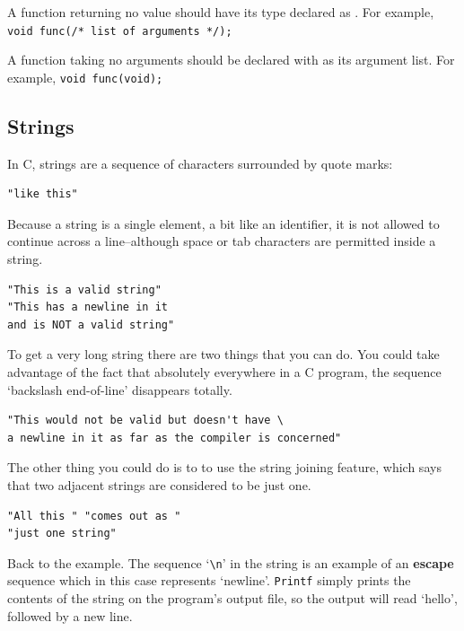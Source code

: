     A function returning no value should have its type declared as
     \void. For example,
     \texttt{void func(/* list of arguments */);}
    

    A function taking no arguments should be declared with \void{}
     as its argument list. For example, \texttt{void func(void);}

   

  

  \subsection{Strings}
   

   In C, strings are a sequence of characters surrounded by quote marks:


   \begin{Verbatim}
"like this"
\end{Verbatim}

   Because a string is a single element, a bit like an identifier, it is not
    allowed to continue across a line--although space or tab characters
    are permitted inside a string.


   \begin{Verbatim}
"This is a valid string"
"This has a newline in it
and is NOT a valid string"
\end{Verbatim}

   To get a very long string there are two things that you can do. You could
    take advantage of the fact that absolutely everywhere in a C program, the
    sequence `backslash end-of-line' disappears totally.


   \begin{Verbatim}
"This would not be valid but doesn't have \
a newline in it as far as the compiler is concerned"
\end{Verbatim}

   The other thing you could do is to to use the string joining feature,
    which says that two adjacent strings are considered to be just one.


   \begin{Verbatim}
"All this " "comes out as "
"just one string"
\end{Verbatim}

   Back to the example. The sequence `\texttt{\textbackslash n}' in the
    string is an example of an \textbf{escape} sequence which in this case
    represents `newline'. \texttt{Printf} simply prints the
    contents of the string on the program's output file, so the output will
    read `hello', followed by a new line.


